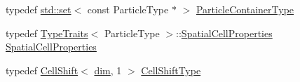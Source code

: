 \begin{DoxyCompactItemize}
\item 
typedef \hyperlink{plot_cells_8m_a03623d69001c34fc77654be29bdc3d8a}{std\+::set}$<$ const Particle\+Type $\ast$ $>$ \hyperlink{structmodel_1_1_spatial_cell_af69747431f1a63b915132ca461175826}{Particle\+Container\+Type}
\item 
typedef \hyperlink{structmodel_1_1_type_traits}{Type\+Traits}$<$ Particle\+Type $>$\+::\hyperlink{structmodel_1_1_spatial_cell_ad6f145a54655710a13a468cec1e0ff7a}{Spatial\+Cell\+Properties} \hyperlink{structmodel_1_1_spatial_cell_ad6f145a54655710a13a468cec1e0ff7a}{Spatial\+Cell\+Properties}
\item 
typedef \hyperlink{classmodel_1_1_cell_shift}{Cell\+Shift}$<$ \hyperlink{plot_nd_a_8m_a382f3ca768b275b8d563604f7fc7df73}{dim}, 1 $>$ \hyperlink{structmodel_1_1_spatial_cell_a1483cea20eafc66b70817694ee55d579}{Cell\+Shift\+Type}
\end{DoxyCompactItemize}
